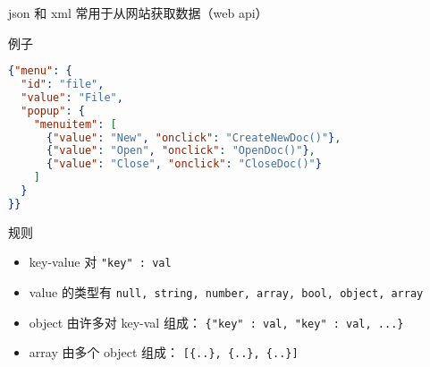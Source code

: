 
json 和 xml 常用于从网站获取数据（web api）

例子
\begin{lstlisting}[language=json]
{"menu": {
  "id": "file",
  "value": "File",
  "popup": {
    "menuitem": [
      {"value": "New", "onclick": "CreateNewDoc()"},
      {"value": "Open", "onclick": "OpenDoc()"},
      {"value": "Close", "onclick": "CloseDoc()"}
    ]
  }
}}
\end{lstlisting}

规则
\begin{itemize}
\item key-value 对 \verb|"key" : val|
\item value 的类型有 \verb|null, string, number, array, bool, object, array|
\item object 由许多对 key-val 组成： \verb|{"key" : val, "key" : val, ...}|
\item array 由多个 object 组成： \verb|[{..}, {..}, {..}]|
\end{itemize}
